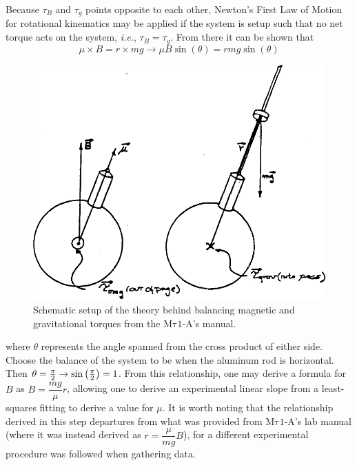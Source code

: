 \documentclass[12pt]{article}
\newcommand{\mtauonea}{\mathrm{M\tau1}\text{-}\mathrm{A}}
\begin{document}
\begin{multicols}{2}
Because $\tau_B$ and $\tau_g$ points opposite to each other, Newton's First Law of Motion
for rotational kinematics may be applied if the system is setup such that no net torque acts on the system,
\textit{i.e.}, $\tau_B=\tau_g$. From there it can be shown that
$$\mu\times B = r\times mg\longrightarrow\mu B\sin(\theta)=rmg\sin(\theta)$$
\begin{figure}[H]
    \centering
    \includegraphics[width=0.98\linewidth]{figs/fig3.png}
    \caption{
        Schematic setup of the theory behind balancing magnetic and gravitational torques
        from the $\mtauonea$'s manual.
    }
\end{figure}
\noindent
where $\theta$ represents the angle spanned from the cross product of either side.
Choose the balance of the system to be when the aluminum rod is horizontal. Then $\theta=\frac{\pi}{2}\rightarrow\sin\qty(\frac{\pi}{2})=1$.
From this relationship, one may derive a formula for $B$ as $B=\dfrac{mg}{\mu}r$,
allowing one to derive an experimental linear slope from a least-squares fitting to derive a value for $\mu$.
It is worth noting that the relationship derived in this step departures from what was provided from
$\mtauonea$'s lab manual (where it was instead derived as $r=\dfrac{\mu}{mg}B$),
for a different experimental procedure was followed when gathering data.


\end{multicols}
\end{document}
